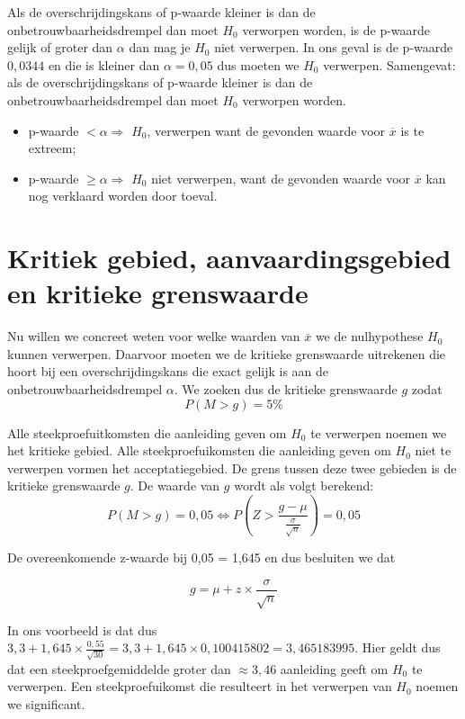 Als de overschrijdingskans of p-waarde kleiner is dan de onbetrouwbaarheidsdrempel dan moet $H_{0}$ verworpen worden, is de p-waarde gelijk of groter dan $\alpha$ dan mag je $H_{0}$ niet verwerpen. In ons geval is de p-waarde $0,0344$ en die is kleiner dan $\alpha = 0,05$ dus moeten we $H_{0}$ verwerpen. Samengevat: als de overschrijdingskans of p-waarde kleiner is dan de onbetrouwbaarheidsdrempel dan moet $H_{0}$ verworpen worden.
\begin{itemize}
  \item p-waarde $< \alpha \Rightarrow$ $H_{0}$, verwerpen want de gevonden waarde voor $\overline{x}$ is te extreem;
  \item p-waarde $\geq \alpha \Rightarrow$ $H_{0}$ niet verwerpen, want de gevonden waarde voor $\overline{x}$ kan nog verklaard worden door toeval.
\end{itemize}

\section{Kritiek gebied, aanvaardingsgebied en kritieke grenswaarde}
Nu willen we concreet weten voor welke waarden van $\overline{x}$ we de nulhypothese $H_{0}$ kunnen verwerpen. Daarvoor moeten we de kritieke grenswaarde uitrekenen die hoort bij een overschrijdingskans die exact gelijk is aan de onbetrouwbaarheidsdrempel $\alpha$. We zoeken dus de kritieke grenswaarde $g$ zodat
\[ P(M > g) = 5 \% \]

Alle steekproefuitkomsten die aanleiding geven om $H_{0}$ te verwerpen noemen we het kritieke gebied. Alle steekproefuikomsten die aanleiding geven om $H_{0}$ niet te verwerpen vormen het acceptatiegebied. De grens tussen deze twee gebieden is de kritieke grenswaarde $g$. De waarde van $g$ wordt als volgt berekend:
\[ P(M > g) = 0,05 \Leftrightarrow P(Z > \frac{g - \mu}{\frac{\sigma}{\sqrt{n}}}) = 0,05 \]

De overeenkomende z-waarde bij 0,05 = 1,645 en dus besluiten we dat

\begin{equation}
  g = \mu +z \times \frac{\sigma}{\sqrt{n}}
  \label{eq:kritiekeRechtseWaarde}
\end{equation}

In ons voorbeeld is dat dus $3,3+1,645 \times \frac{0,55}{\sqrt{30}} = 3,3 + 1,645 \times 0,100415802 = 3,465183995$. Hier geldt dus dat een steekproefgemiddelde groter dan $\approx 3,46$ aanleiding geeft om $H_{0}$ te verwerpen. Een steekproefuikomst die resulteert in het verwerpen van $H_{0}$ noemen we significant.

